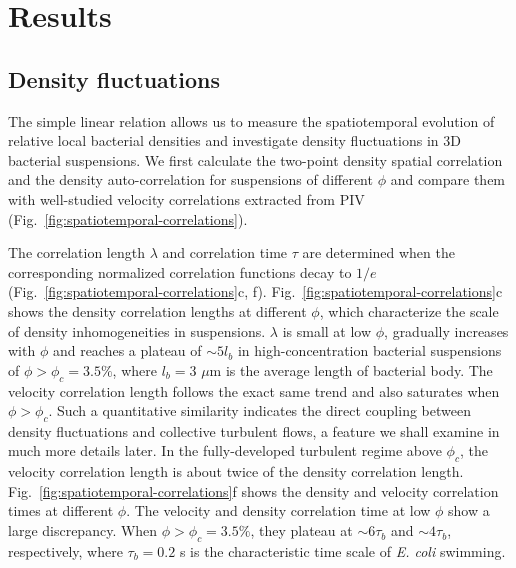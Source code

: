 \documentclass[twocolumn,aps,prx,amsmath,amssymb,longbibliography]{revtex4-2}
\begin{document}
\section{Results}

\subsection{Density fluctuations}

The simple linear relation allows us to measure the spatiotemporal evolution of relative local bacterial densities and investigate density fluctuations in 3D bacterial suspensions. We first calculate the two-point density spatial correlation and the density auto-correlation for suspensions of different $\phi$ and compare them with well-studied velocity correlations extracted from PIV (Fig.~\ref{fig:spatiotemporal-correlations}).

The correlation length $\lambda$ and correlation time $\tau$ are determined when the corresponding normalized correlation functions decay to $1/e$ (Fig.~\ref{fig:spatiotemporal-correlations}c, f). Fig.~\ref{fig:spatiotemporal-correlations}c shows the density correlation lengths at different $\phi$, which characterize the scale of density inhomogeneities in suspensions.
$\lambda$ is small at low $\phi$, gradually increases with $\phi$ and reaches a plateau of $\sim 5l_b$ in high-concentration bacterial suspensions of $\phi > \phi_c = 3.5\%$, where $l_b=3$ $\mu$m is the average length of bacterial body. The velocity correlation length follows the exact same trend and also saturates when $\phi > \phi_c$. Such a quantitative similarity indicates the direct coupling between density fluctuations and collective turbulent flows, a feature we shall examine in much more details later. In the fully-developed turbulent regime above $\phi_c$, the velocity correlation length is about twice of the density correlation length.
Fig.~\ref{fig:spatiotemporal-correlations}f shows the density and velocity correlation times at different $\phi$. The velocity and density correlation time at low $\phi$ show a large discrepancy. When $\phi > \phi_c=3.5\%$, they plateau at $\sim 6\tau_b$ and $\sim 4\tau_b$, respectively, where $\tau_b=0.2$ s is the characteristic time scale of \textit{E. coli} swimming.
\end{document}
